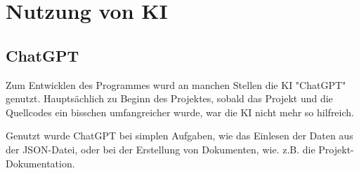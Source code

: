 \documentclass{article}
\begin{document}
\section{Nutzung von KI}
\subsection{ChatGPT}
Zum Entwicklen des Programmes wurd an manchen Stellen die KI "ChatGPT" genutzt. Hauptsächlich zu Beginn des Projektes, sobald das Projekt und 
die Quellcodes ein bisschen umfangreicher wurde, war die KI nicht mehr so hilfreich. 

Genutzt wurde ChatGPT bei simplen Aufgaben, wie das Einlesen der Daten aus der JSON-Datei, oder bei der Erstellung von Dokumenten, wie. z.B. die
Projekt-Dokumentation.
\end{document}
